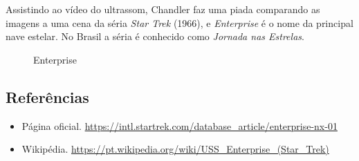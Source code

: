 Assistindo ao vídeo do ultrassom, Chandler faz uma piada comparando as
imagens a uma cena da séria \emph{Star Trek} (1966), e \emph{Enterprise}
é o nome da principal nave estelar. No Brasil a séria é conhecido como
\emph{Jornada nas Estrelas}.

\begin{figure}
  \centering
    \caption{Enterprise\label{fig:enterprise}}
\end{figure}

\hypertarget{referuxeancias-5}{%
\subsection{Referências}\label{referuxeancias-5}}

\begin{itemize}
\tightlist
\item
  \sloppy Página oficial. \url{https://intl.startrek.com/database_article/enterprise-nx-01}
\item
  \sloppy Wikipédia. \url{https://pt.wikipedia.org/wiki/USS_Enterprise_(Star_Trek)}
\end{itemize}
